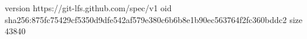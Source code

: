version https://git-lfs.github.com/spec/v1
oid sha256:875fc75429cf5350d9dfe542af579e380c6b6b8e1b90ec563764f2fc360bddc2
size 43840
